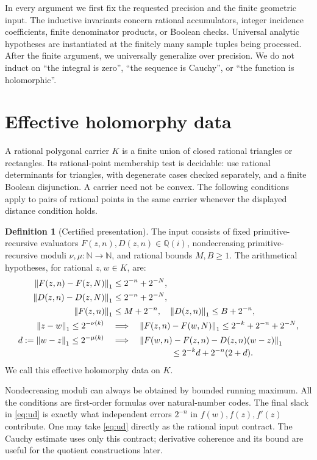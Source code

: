 \documentclass[11pt]{article}
\theoremstyle{definition}
\newtheorem{definition}[theorem]{Definition}
\newcommand{\N}{\mathbb N}
\newcommand{\Q}{\mathbb Q}
\newcommand{\norm}[1]{\left\lVert#1\right\rVert_1}
\begin{document}
In every argument we first fix the requested precision and the finite
geometric input. The inductive invariants concern rational accumulators,
integer incidence coefficients, finite denominator products, or Boolean
checks. Universal analytic hypotheses are instantiated at the finitely
many sample tuples being processed. After the finite argument, we
universally generalize over precision. We do not induct on ``the
integral is zero'', ``the sequence is Cauchy'', or ``the function is
holomorphic''.

\section{Effective holomorphy data}\label{sec:data}

A rational polygonal carrier \(K\) is a finite union of closed rational
triangles or rectangles. Its rational-point membership test is decidable:
use rational determinants for triangles, with degenerate cases checked
separately, and a finite Boolean disjunction. A carrier need not be
convex. The following conditions apply to pairs of rational points in
the same carrier whenever the displayed distance condition holds.

\begin{definition}[Certified presentation]\label{def:hol}
The input consists of fixed primitive-recursive evaluators
\(F(z,n),D(z,n)\in\Q(i)\), nondecreasing primitive-recursive moduli
\(\nu,\mu:\N\to\N\), and rational bounds \(M,B\ge1\).
The arithmetical hypotheses, for rational \(z,w\in K\), are:
\begin{align}
 \norm{F(z,n)-F(z,N)}&\le2^{-n}+2^{-N},\label{eq:coh}\\
 \norm{D(z,n)-D(z,N)}&\le2^{-n}+2^{-N},\label{eq:dcoh}\\
 \norm{F(z,n)}&\le M+2^{-n},\quad
 \norm{D(z,n)}\le B+2^{-n},\label{eq:bounds}\\
 \norm{z-w}\le2^{-\nu(k)}\quad&\Longrightarrow\quad
 \norm{F(z,n)-F(w,N)}\le2^{-k}+2^{-n}+2^{-N},\label{eq:uc}\\
 d:=\norm{w-z}\le2^{-\mu(k)}\quad&\Longrightarrow\quad
 \norm{F(w,n)-F(z,n)-D(z,n)(w-z)}\notag\\[-2pt]
 &\hspace{24mm}\le2^{-k}d+2^{-n}(2+d).\label{eq:ud}
\end{align}
We call this effective holomorphy data on \(K\).
\end{definition}

Nondecreasing moduli can always be obtained by bounded running maximum.
All the conditions are first-order formulas over natural-number codes.
The final slack in \eqref{eq:ud} is exactly what independent errors
\(2^{-n}\) in \(f(w),f(z),f'(z)\) contribute. One may take
\eqref{eq:ud} directly as the rational input contract. The Cauchy estimate
uses only this contract; derivative coherence and its bound are useful
for the quotient constructions later.
\end{document}

